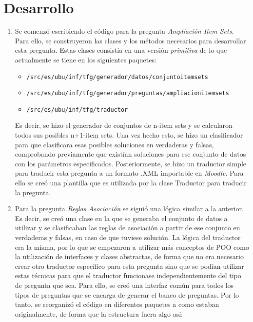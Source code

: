 \section{Desarrollo}

\begin{enumerate}
    \item Se comenzó escribiendo el código para la pregunta \textit{Ampliación Item Sets}. Para ello, se construyeron las clases y los métodos necesarios para desarrollar esta pregunta. Estas clases consistía en una versión \textit{primitiva} de lo que actualmente se tiene en los siguientes paquetes: 
    \begin{itemize}
        \item \texttt{/src/es/ubu/inf/tfg/generador/datos/conjuntoitemsets}
        \item \texttt{/src/es/ubu/inf/tfg/generador/preguntas/ampliacionitemsets}
        \item \texttt{/src/es/ubu/inf/tfg/traductor}
    \end{itemize}
    Es decir, se hizo el generador de conjuntos de n-item sets y se calcularon todos sus posibles n+1-item sets. Una vez hecho esto, se hizo un clasificador para que clasificara esas posibles soluciones en verdaderas y falsas, comprobando previamente que existían soluciones para ese conjunto de datos con los parámetros especificados. Posteriormente, se hizo un traductor simple para traducir esta pregunta a un formato .XML importable en \textit{Moodle}. Para ello se creó una plantilla que es utilizada por la clase Traductor para traducir la pregunta.
    \item Para la pregunta \textit{Reglas Asociación} se siguió una lógica similar a la anterior. Es decir, se creó una clase en la que se generaba el conjunto de datos a utilizar y se clasificaban las reglas de asociación a partir de ese conjunto en verdaderas y falsas, en caso de que tuviese solución. La lógica del traductor era la misma, por lo que se empezaron a utilizar más conceptos de POO como la utilización de interfaces y clases abstractas, de forma que no era necesario crear otro traductor específico para esta pregunta sino que se podían utilizar estas técnicas para que el traductor funcionase independientemente del tipo de pregunta que sea. Para ello, se creó una interfaz común para todos los tipos de preguntas que se encarga de generar el banco de preguntas. Por lo tanto, se reorganizó el código en diferentes paquetes a como estaban originalmente, de forma que la estructura fuera algo así:
    \begin{itemize}

\end{itemize}
\end{enumerate}
